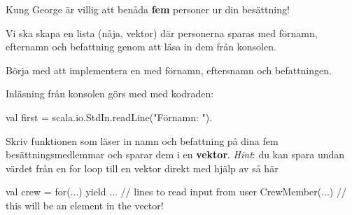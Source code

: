 %
%
%
%
%
%
%
%
%
%

\Subtask Kung George {\"a}r villig att ben{\aa}da {\bf fem} personer ur din bes{\"a}ttning!

Vi ska skapa en lista (nåja, vektor) d{\"a}r personerna sparas med f{\"o}rnamn, efternamn och befattning genom att l{\"a}sa in dem fr{\aa}n konsolen.

Börja med att implementera en  med förnamn, eftersnamn och befattningen.

\Subtask Inl{\"a}sning från konsolen g{\"o}rs med  med kodraden:
\begin{Code}
val first = scala.io.StdIn.readLine("Förnamn: ").
\end{Code}

Skriv funktionen  som läser in namn och befattning på dina fem besättningsmedlemmar och sparar dem i en {\bf vektor}. \emph{Hint}: du kan spara undan värdet från en for loop till en vektor direkt med hjälp av  så här
\begin{CodeSmall}
val crew = for(...) yield {
... // lines to read input from user
	CrewMember(...) // this will be an element in the vector!
}
\end{CodeSmall}


